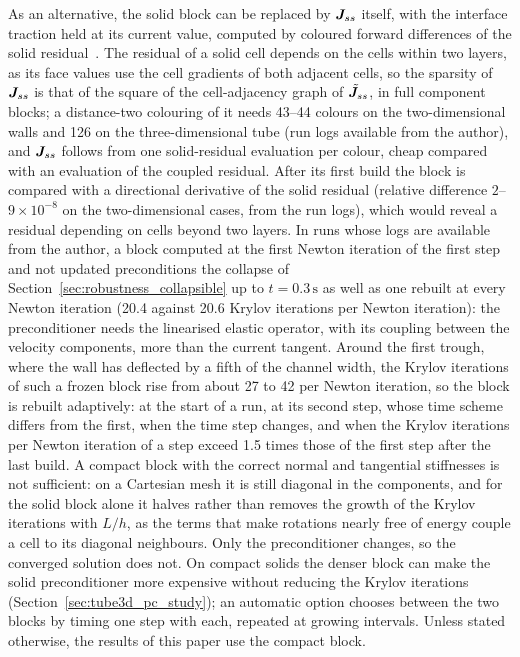 As an alternative, the solid block can be replaced by $\boldsymbol{J}_{ss}$ itself, with the interface traction held at its current value, computed by coloured forward differences of the solid residual~\citep{Curtis1974, Gebremedhin2005}.
The residual of a solid cell depends on the cells within two layers, as its face values use the cell gradients of both adjacent cells, so the sparsity of $\boldsymbol{J}_{ss}$ is that of the square of the cell-adjacency graph of $\tilde{\boldsymbol{J}}_{ss}$, in full component blocks; a distance-two colouring of it needs 43--44 colours on the two-dimensional walls and 126 on the three-dimensional tube (run logs available from the author), and $\boldsymbol{J}_{ss}$ follows from one solid-residual evaluation per colour, cheap compared with an evaluation of the coupled residual.
After its first build the block is compared with a directional derivative of the solid residual (relative difference $2$--$9\times10^{-8}$ on the two-dimensional cases, from the run logs), which would reveal a residual depending on cells beyond two layers.
In runs whose logs are available from the author, a block computed at the first Newton iteration of the first step and not updated preconditions the collapse of Section~\ref{sec:robustness_collapsible} up to $t = 0.3\,\mathrm{s}$ as well as one rebuilt at every Newton iteration (20.4 against 20.6 Krylov iterations per Newton iteration): the preconditioner needs the linearised elastic operator, with its coupling between the velocity components, more than the current tangent.
Around the first trough, where the wall has deflected by a fifth of the channel width, the Krylov iterations of such a frozen block rise from about 27 to 42 per Newton iteration, so the block is rebuilt adaptively: at the start of a run, at its second step, whose time scheme differs from the first, when the time step changes, and when the Krylov iterations per Newton iteration of a step exceed 1.5 times those of the first step after the last build.
A compact block with the correct normal and tangential stiffnesses is not sufficient: on a Cartesian mesh it is still diagonal in the components, and for the solid block alone it halves rather than removes the growth of the Krylov iterations with $L/h$, as the terms that make rotations nearly free of energy couple a cell to its diagonal neighbours.
Only the preconditioner changes, so the converged solution does not.
On compact solids the denser block can make the solid preconditioner more expensive without reducing the Krylov iterations (Section~\ref{sec:tube3d_pc_study}); an automatic option chooses between the two blocks by timing one step with each, repeated at growing intervals.
Unless stated otherwise, the results of this paper use the compact block.


